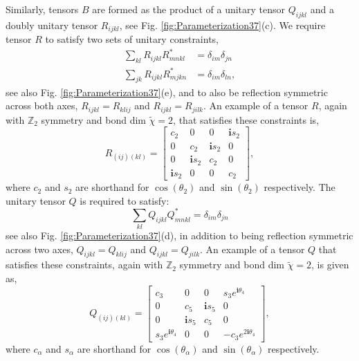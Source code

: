 \documentclass[aps,prl,twocolumn,showpacs,superscriptaddress,floatfix,10pt]{revtex4-1}
\begin{document}
Similarly, tensors $B$ are formed as the product of a unitary tensor $Q_{ijkl}$ and a doubly unitary tensor $R_{ijkl}$, see Fig. \ref{fig:Parameterization37}(c). We require tensor $R$ to satisfy two sets of unitary constraints, 
\begin{align}
\sum\limits_{kl} {{R_{ijkl}}R_{mnkl}^*}  & = {\delta _{im}}{\delta _{jn}}\nonumber \\
\sum\limits_{jk} {{R_{ijkl}}R_{mjkn}^*}  & = {\delta _{im}}{\delta _{ln}},
\end{align}
see also Fig. \ref{fig:Parameterization37}(e), and to also be reflection symmetric across both axes, $R_{ijkl} = R_{klij}$ and $R_{ijkl} = R_{jilk}$. An example of a tensor $R$, again with $\mathbb{Z}_2$ symmetry and bond dim $\tilde \chi = 2$, that satisfies these constraints is,
\begin{equation}
{R_{(ij)(kl)}} = \left[ {\begin{array}{*{20}{c}}
{{c_2}}&0&0&{\mathbf{i}{s_2}}\\
0&{{c_2}}&{\mathbf{i}{s_2}}&0\\
0&{\mathbf{i}{s_2}}&{{c_2}}&0\\
{\mathbf{i}{s_2}}&0&0&{{c_2}}
\end{array}} \right],\label{eq:Rparam}
\end{equation}
where $c_2$ and $s_2$ are shorthand for $\cos(\theta_2)$ and $\sin(\theta_2)$ respectively. The unitary tensor $Q$ is required to satisfy: 
\begin{equation}
\sum\limits_{kl} {{Q_{ijkl}}Q_{mnkl}^*}  = {\delta _{im}}{\delta _{jn}}
\end{equation}
see also Fig. \ref{fig:Parameterization37}(d), in addition to being reflection symmetric across two axes, $Q_{ijkl} = Q_{klij}$ and $Q_{ijkl} = Q_{jilk}$. An example of a tensor $Q$ that satisfies these constraints, again with $\mathbb{Z}_2$ symmetry and bond dim $\tilde \chi = 2$, is given as,
\begin{equation}
{Q_{(ij)(kl)}} = \left[ {\begin{array}{*{20}{c}}
{{c_3}}&0&0&{{s_3}{e^{\mathbf{i}{\theta _4}}}}\\
0&{{c_5}}&{\mathbf{i}{s_5}}&0\\
0&{\mathbf{i}{s_5}}&{{c_5}}&0\\
{{s_3}{e^{\mathbf{i}{\theta _4}}}}&0&0&{ - {c_3}{e^{2\mathbf{i}{\theta _4}}}}
\end{array}} \right],\label{eq:Qparam}
\end{equation}
where $c_\alpha$ and $s_\alpha$ are shorthand for $\cos(\theta_\alpha)$ and $\sin(\theta_\alpha)$ respectively.
\end{document}
